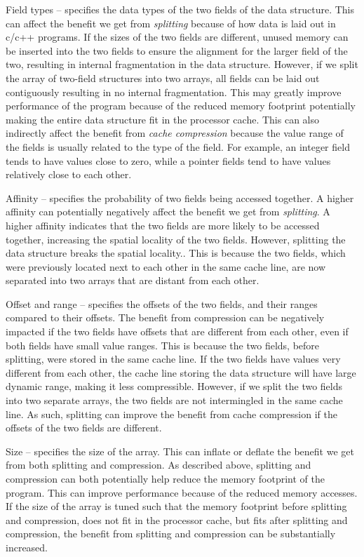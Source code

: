 \item Field types -- specifies the data types of the two fields of the data
structure. This can affect the benefit we get from {\em splitting} because of
how data is laid out in c/c++ programs. If the sizes of the two fields are
different, unused memory can be inserted into the two fields to ensure the
alignment for the larger field of the two, resulting in internal fragmentation
in the data structure. However, if we split the array of two-field structures
into two arrays, all fields can be laid out contiguously resulting in no
internal fragmentation. This may greatly improve performance of the program
because of the reduced memory footprint potentially making the entire data
structure fit in the processor cache. This can also indirectly affect the
benefit from {\em cache compression} because the value range of the fields is
usually related to the type of the field. For example, an integer field tends to
have values close to zero, while a pointer fields tend to have values relatively
close to each other.

\item Affinity -- specifies the probability of two fields being accessed
together. A higher affinity can potentially negatively affect the benefit we get
from {\em splitting}. A higher affinity indicates that the two fields are more
likely to be accessed together, increasing the spatial locality of the two
fields. However, splitting the data structure breaks the spatial locality.. This
is because the two fields, which were previously located next to each other in
the same cache line, are now separated into two arrays that are distant from
each other.

\item Offset and range -- specifies the offsets of the two fields, and their
ranges compared to their offsets. The benefit from compression can be negatively
impacted if the two fields have offsets that are different from each other, even
if both fields have small value ranges. This is because the two fields, before
splitting, were stored in the same cache line. If the two fields have values
very different from each other, the cache line storing the data structure will
have large dynamic range, making it less compressible. However, if we split the
two fields into two separate arrays, the two fields are not intermingled in the
same cache line. As such, splitting can improve the benefit from cache
compression if the offsets of the two fields are different.

\item Size -- specifies the size of the array. This can inflate or deflate the
benefit we get from both splitting and compression. As described above,
splitting and compression can both potentially help reduce the memory footprint
of the program. This can improve performance because of the reduced memory
accesses. If the size of the array is tuned such that the memory footprint
before splitting and compression, does not fit in the processor cache, but fits
after splitting and compression, the benefit from splitting and compression can
be substantially increased.

